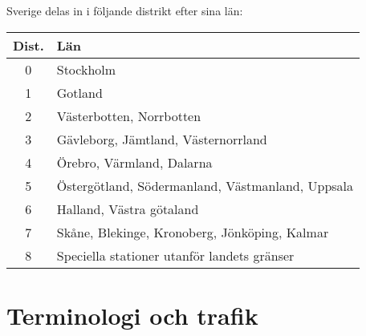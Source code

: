 Sverige delas in i följande distrikt efter sina län:

\begin{center}
\begin{longtable}{cl}
	\textbf{Dist.} & \textbf{Län}                                     \\ \hline \endhead
	      0        & Stockholm                                        \\
	      1        & Gotland                                          \\
	      2        & Västerbotten, Norrbotten                         \\
	      3        & Gävleborg, Jämtland, Västernorrland              \\
	      4        & Örebro, Värmland, Dalarna                        \\
	      5        & Östergötland, Södermanland, Västmanland, Uppsala \\
	      6        & Halland, Västra götaland                         \\
	      7        & Skåne, Blekinge, Kronoberg, Jönköping, Kalmar    \\
	      8        & Speciella stationer utanför landets gränser
\end{longtable}
\end{center}

\section{Terminologi och trafik}

